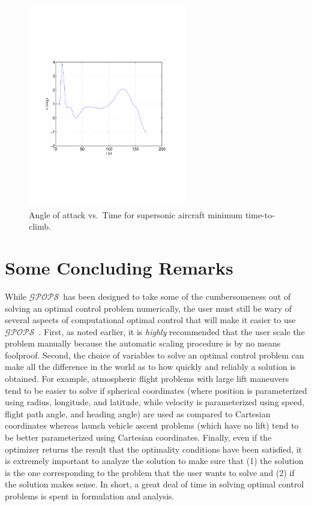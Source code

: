 \documentclass[10pt,final]{report}
\newcommand{\gpops}{$\mathcal{GPOPS}$~}
\newcounter{example}[chapter]
\begin{document}
\begin{figure}[H]
  \centering
  \includegraphics[height=3.5in]{nvstMinClimb.pdf}
  \caption{Angle of attack vs.~Time for supersonic aircraft minimum time-to-climb.}
\end{figure}

\section{Some Concluding Remarks}

While \gpops has been designed to take some of the cumbersomeness out of
solving an optimal control problem numerically, the user must still be wary of
several aspects of computational optimal control that will make it easier to
use \gpops.  First, as noted earlier, it is {\em highly} recommended that
the user scale the problem manually because the automatic scaling procedure is
by no means foolproof.  Second, the choice of variables to solve an optimal
control problem can make all the difference in the world as to how quickly and
reliably a solution is obtained.  For example, atmospheric flight problems
with large lift maneuvers tend to be easier to solve if spherical coordinates
(where position is parameterized using radius, longitude, and latitude, while
velocity is parameterized using speed, flight path angle, and heading angle)
are used as compared to Cartesian coordinates whereas launch vehicle ascent
problems (which have no lift) tend to be better parameterized using Cartesian
coordinates.  Finally, even if the optimizer returns the result that the
optimality conditions have been satisfied, it is extremely important to
analyze the solution to make sure that (1) the solution is the one
corresponding to the problem that the user wants to solve and (2) if the
solution makes sense.  In short, a great deal of time in solving optimal
control problems is spent in formulation and analysis.
\end{document}
